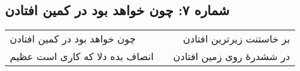 \begin{center}
\section*{شماره ۷: چون خواهد بود در کمین افتادن}
\label{sec:007}
\begin{longtable}{l p{0.5cm} r}
چون خواهد بود در کمین افتادن
&&
بر خاستنت زیرترین افتادن
\\
انصاف بده دلا که کاری است عظیم
&&
در ششدرهٔ روی زمین افتادن
\\
\end{longtable}
\end{center}
